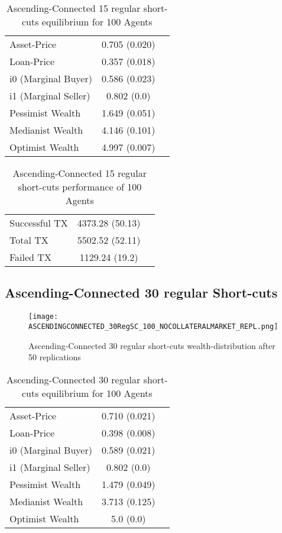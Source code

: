 \documentclass[Bachelorarbeit.tex]{subfiles}
\begin{document}
\begin{table}[!htbp]
	\caption{Ascending-Connected 15 regular short-cuts equilibrium for 100 Agents}
	\centering
	\begin{tabular} { l c r }
		\hline
		Asset-Price & 0.705 (0.020) \\
		Loan-Price & 0.357 (0.018) \\
		i0 (Marginal Buyer) & 0.586 (0.023) \\
		i1 (Marginal Seller) & 0.802 (0.0) \\
		Pessimist Wealth & 1.649 (0.051) \\
		Medianist Wealth & 4.146 (0.101) \\
		Optimist Wealth & 4.997 (0.007) \\
		\hline
	\end{tabular}
\end{table} 

\begin{table}[!htbp]
	\caption{Ascending-Connected 15 regular short-cuts performance of 100 Agents}
	\centering
	\begin{tabular} { l c r }
		\hline
		Successful TX & 4373.28 (50.13) \\
		Total TX & 5502.52 (52.11) \\
		Failed TX & 1129.24 (19.2) \\
		\hline
	\end{tabular}
\end{table}

\subsection{Ascending-Connected 30 regular Short-cuts }
\begin{figure}[!htbp]
	\centering
  \texttt{[image: ASCENDINGCONNECTED\_30RegSC\_100\_NOCOLLATERALMARKET\_REPL.png]}
	\caption{Ascending-Connected 30 regular short-cuts wealth-distribution after 50 replications}
	\label{fig1}
\end{figure}

\begin{table}[!htbp]
	\caption{Ascending-Connected 30 regular short-cuts equilibrium for 100 Agents}
	\centering
	\begin{tabular} { l c r }
		\hline
		Asset-Price & 0.710 (0.021) \\
		Loan-Price & 0.398 (0.008) \\
		i0 (Marginal Buyer) & 0.589 (0.021) \\
		i1 (Marginal Seller) & 0.802 (0.0) \\
		Pessimist Wealth & 1.479 (0.049) \\
		Medianist Wealth & 3.713 (0.125) \\
		Optimist Wealth & 5.0 (0.0) \\
		\hline
	\end{tabular}
\end{table} 
\end{document}
